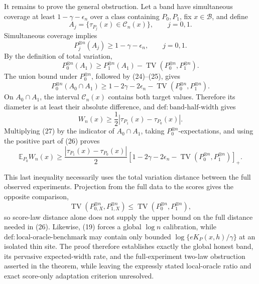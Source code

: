 It remains to prove the general obstruction. Let a band have simultaneous coverage at least \(1-\gamma-\epsilon_n\) over a class containing \(P_0,P_1\), fix \(x\in\mathcal B\), and define
\[
A_j=\{\tau_{P_j}(x)\in\mathcal C_n(x)\},
\qquad j=0,1.
\]
Simultaneous coverage implies
\[
P_j^{\otimes n}(A_j)\ge1-\gamma-\epsilon_n,
\qquad j=0,1. \tag{24}
\]
By the definition of total variation,
\[
P_0^{\otimes n}(A_1)
\ge P_1^{\otimes n}(A_1)
-\operatorname{TV}(P_0^{\otimes n},P_1^{\otimes n}). \tag{25}
\]
The union bound under \(P_0^{\otimes n}\), followed by (24)--(25), gives
\[
P_0^{\otimes n}(A_0\cap A_1)
\ge1-2\gamma-2\epsilon_n
-\operatorname{TV}(P_0^{\otimes n},P_1^{\otimes n}). \tag{26}
\]
On \(A_0\cap A_1\), the interval \(\mathcal C_n(x)\) contains both target values. Therefore its diameter is at least their absolute difference, and \(\mathrm{def:band\text{-}half\text{-}width}\) gives
\[
W_n(x)\ge\frac12|\tau_{P_1}(x)-\tau_{P_0}(x)|. \tag{27}
\]
Multiplying (27) by the indicator of \(A_0\cap A_1\), taking \(P_0^{\otimes n}\)-expectations, and using the positive part of (26) proves
\[
\mathbb E_{P_0}W_n(x)\ge\frac{|\tau_{P_1}(x)-\tau_{P_0}(x)|}{2}
\left[1-2\gamma-2\epsilon_n-
\operatorname{TV}(P_0^{\otimes n},P_1^{\otimes n})\right]_+.
\]

This last inequality necessarily uses the total variation distance between the full observed experiments. Projection from the full data to the scores gives the opposite comparison,
\[
\operatorname{TV}(P_{0,X}^{\otimes n},P_{1,X}^{\otimes n})
\le\operatorname{TV}(P_0^{\otimes n},P_1^{\otimes n}),
\]
so score-law distance alone does not supply the upper bound on the full distance needed in (26). Likewise, (19) forces a global \(\log n\) calibration, while \(\mathrm{def:local\text{-}oracle\text{-}benchmark}\) may contain only bounded \(\log\{eK_P(x,h)/\gamma\}\) at an isolated thin site. The proof therefore establishes exactly the global honest band, its pervasive expected-width rate, and the full-experiment two-law obstruction asserted in the theorem, while leaving the expressly stated local-oracle ratio and exact score-only adaptation criterion unresolved.